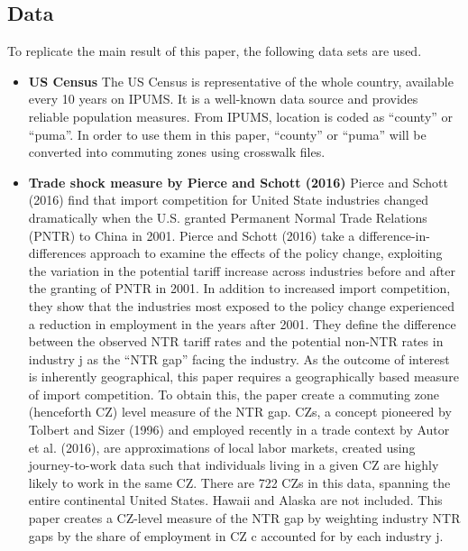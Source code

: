 \documentclass[12pt, final]{CSP}
\begin{document}
\subsection{Data}
To replicate the main result of this paper, the following data sets are used.
\begin{itemize}
\item \textbf{US Census} 
\newline
\newline
The US Census is representative of the whole country, available every 10 years on IPUMS. It is a well-known data source and provides reliable population measures. From IPUMS, location is coded as “county” or “puma”. In order to use them in this paper, “county” or “puma” will be converted into commuting zones using crosswalk files.
\newline
\item \textbf{Trade shock measure by Pierce and Schott (2016)} \cite{pierce2016surprisingly} 
\newline
\newline
Pierce and Schott (2016) \cite{pierce2016surprisingly} find that import competition for United State industries changed dramatically when the U.S. granted Permanent Normal Trade Relations (PNTR) to China in 2001. Pierce and Schott (2016) \cite{pierce2016surprisingly} take a difference-in-differences approach to examine the effects of the policy change, exploiting the variation in the potential tariff increase across industries before and after the granting of PNTR in 2001. In addition to increased import competition, they show that the industries most exposed to the policy change experienced a reduction in employment in the years after 2001. They deﬁne the difference between the observed NTR tariff rates and the potential non-NTR rates in industry j as the “NTR gap” facing the industry. As the outcome of interest is inherently geographical, this paper requires a geographically based measure of import competition. To obtain this, the paper create a commuting zone (henceforth CZ) level measure of the NTR gap. CZs, a concept pioneered by Tolbert and Sizer (1996)\cite{tolbert1996us} and employed recently in a trade context by Autor et al. (2016)\cite{autor2016china}, are approximations of local labor markets, created using journey-to-work data such that individuals living in a given CZ are highly likely to work in the same CZ. There are 722 CZs in this data, spanning the entire continental United States. Hawaii and Alaska are not included. This paper creates a CZ-level measure of the NTR gap by weighting industry NTR gaps by the share of employment in CZ c accounted for by each industry j.

\end{itemize}
\end{document}

